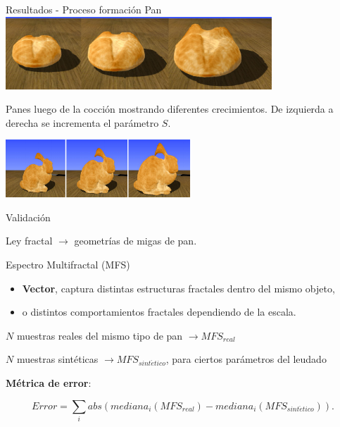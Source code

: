 \documentclass[spanish,unknownkeysallowed,10pt]{beamer}
\begin{document}
\begin{frame}{Resultados - Proceso formación Pan}
\includegraphics[width=10cm]{../figures/Fig14}

Panes luego de la cocción mostrando diferentes crecimientos. De izquierda a derecha se incrementa el parámetro $S$.

\includegraphics[width=7cm]{../figures/Fig15}


\end{frame}


\begin{frame}{Validación}

Ley fractal $\rightarrow$ geometrías de migas de pan.

\begin{block}{Espectro Multifractal (MFS)}

\begin{itemize}
\item \textbf{Vector}, captura distintas estructuras fractales dentro del mismo objeto,
\item o distintos comportamientos fractales dependiendo de la escala.
\end{itemize}
\end{block}

$N$ muestras reales del mismo tipo de pan $\rightarrow MFS_{real}$

$N$ muestras sintéticas $\rightarrow MFS_{sint\acute{e}tico}$, para ciertos parámetros del leudado

\textbf{Métrica de error}:

\begin{equation*}
Error = \displaystyle \sum_{i} abs(mediana_{i}(MFS_{real})-mediana_{i}(MFS_{sint\acute{e}tico})).
\end{equation*}

\end{frame}
\end{document}
